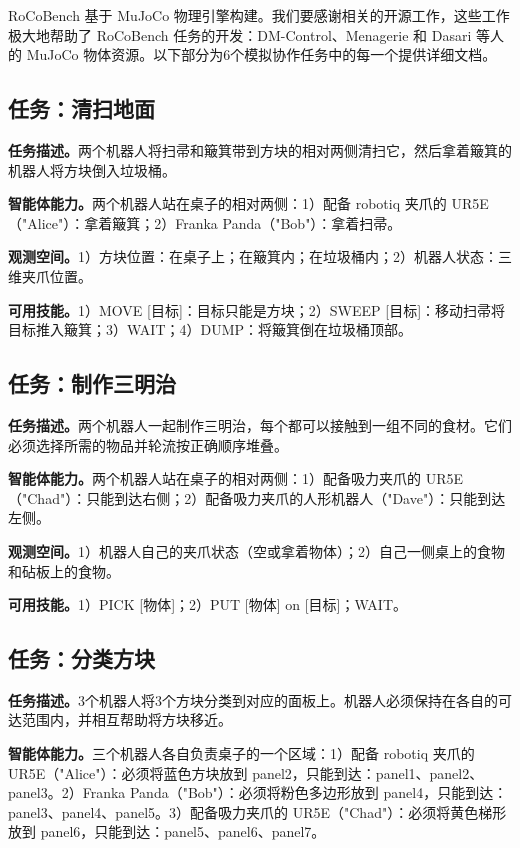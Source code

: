 \documentclass[UTF8, a4paper, 12pt]{article}
\begin{document}
RoCoBench 基于 MuJoCo 物理引擎构建。我们要感谢相关的开源工作，这些工作极大地帮助了 RoCoBench 任务的开发：DM-Control、Menagerie 和 Dasari 等人的 MuJoCo 物体资源。以下部分为6个模拟协作任务中的每一个提供详细文档。

\subsection{任务：清扫地面}

\textbf{任务描述。}两个机器人将扫帚和簸箕带到方块的相对两侧清扫它，然后拿着簸箕的机器人将方块倒入垃圾桶。

\textbf{智能体能力。}两个机器人站在桌子的相对两侧：1）配备 robotiq 夹爪的 UR5E（"Alice"）：拿着簸箕；2）Franka Panda（"Bob"）：拿着扫帚。

\textbf{观测空间。}1）方块位置：在桌子上；在簸箕内；在垃圾桶内；2）机器人状态：三维夹爪位置。

\textbf{可用技能。}1）MOVE [目标]：目标只能是方块；2）SWEEP [目标]：移动扫帚将目标推入簸箕；3）WAIT；4）DUMP：将簸箕倒在垃圾桶顶部。

\subsection{任务：制作三明治}

\textbf{任务描述。}两个机器人一起制作三明治，每个都可以接触到一组不同的食材。它们必须选择所需的物品并轮流按正确顺序堆叠。

\textbf{智能体能力。}两个机器人站在桌子的相对两侧：1）配备吸力夹爪的 UR5E（"Chad"）：只能到达右侧；2）配备吸力夹爪的人形机器人（"Dave"）：只能到达左侧。

\textbf{观测空间。}1）机器人自己的夹爪状态（空或拿着物体）；2）自己一侧桌上的食物和砧板上的食物。

\textbf{可用技能。}1）PICK [物体]；2）PUT [物体] on [目标]；WAIT。

\subsection{任务：分类方块}

\textbf{任务描述。}3个机器人将3个方块分类到对应的面板上。机器人必须保持在各自的可达范围内，并相互帮助将方块移近。

\textbf{智能体能力。}三个机器人各自负责桌子的一个区域：1）配备 robotiq 夹爪的 UR5E（"Alice"）：必须将蓝色方块放到 panel2，只能到达：panel1、panel2、panel3。2）Franka Panda（"Bob"）：必须将粉色多边形放到 panel4，只能到达：panel3、panel4、panel5。3）配备吸力夹爪的 UR5E（"Chad"）：必须将黄色梯形放到 panel6，只能到达：panel5、panel6、panel7。
\end{document}

